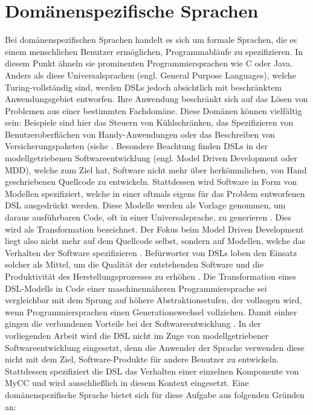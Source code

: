 \section{Domänenspezifische Sprachen}
Bei domänenspezifischen Sprachen handelt es sich um formale Sprachen, die es einem menschlichen Benutzer ermöglichen, Programmabläufe zu spezifizieren. In diesem Punkt ähneln sie prominenten Programmiersprachen wie C oder Java. Anders als diese Universalsprachen (engl. General Purpose Languages), welche Turing-vollständig sind, werden DSLs jedoch absichtlich mit beschränktem Anwendungsgebiet entworfen. Ihre Anwendung beschränkt sich auf das Lösen von Problemen aus einer bestimmten Fachdomäne. Diese Domänen können vielfältig sein: Beispiele sind hier das Steuern von Kühlschränken, das Spezifizieren von Benutzeroberflächen von Handy-Anwendungen oder das Beschreiben von Versicherungspaketen (siehe \cite[S. 93ff.]{Kelly:08}. Besondere Beachtung finden DSLs in der modellgetriebenen Softwareentwicklung (engl. Model Driven Development oder MDD), welche zum Ziel hat, Software nicht mehr über herkömmlichen, von Hand geschriebenen Quellcode zu entwickeln. Stattdessen wird Software in Form von Modellen spezifiziert, welche in einer oftmals eigens für das Problem entworfenen DSL ausgedrückt werden. Diese Modelle werden als Vorlage genommen, um daraus ausführbaren Code, oft in einer  Universalsprache, zu generieren \cite[S. 29]{Voelter:13}. Dies wird als Transformation bezeichnet. Der Fokus beim Model Driven Development liegt also nicht mehr auf dem Quellcode selbst, sondern auf Modellen, welche das Verhalten der Software spezifizieren \cite[S. 3]{Kleppe:09}. Befürworter von DSLs loben den Einsatz solcher als Mittel, um die Qualität der entstehenden Software und die Produktivität des Herstellungsprozesses zu erhöhen \cite[S. 33f]{Fowler:11}. Die Transformation eines DSL-Modells in Code einer maschinennäheren Programmiersprache sei vergleichbar mit dem Sprung auf höhere Abstraktionsstufen, der vollzogen wird, wenn Programmiersprachen einen Generationswechsel vollziehen. Damit einher gingen die verbundenen Vorteile bei der Softwareentwicklung \cite[S. 15ff]{Kelly:08}.
\newline
In der vorliegenden Arbeit wird die DSL nicht im Zuge von modellgetriebener Softwareentwicklung eingesetzt, denn die Anwender der Sprache verwenden diese nicht mit dem Ziel, Software-Produkte für andere Benutzer zu entwickeln. Stattdessen spezifiziert die DSL das Verhalten einer einzelnen Komponente von MyCC und wird ausschließlich in diesem Kontext eingesetzt. Eine domänenspezifische Sprache bietet sich für diese Aufgabe aus folgenden Gründen an: 
